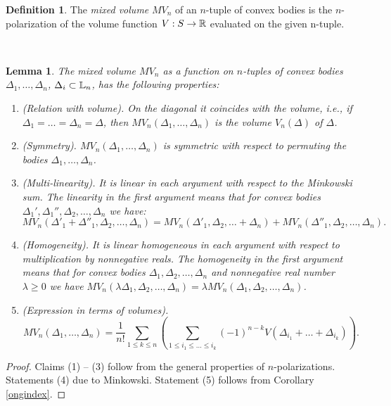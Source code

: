 \documentclass[11pt]{article}
\theoremstyle{plain}
\newtheorem{lemma}[theorem]{Lemma}
\theoremstyle{definition}
\newtheorem{definition}[theorem]{Definition}
\begin{document}
\begin{definition} The {\it  mixed volume} $MV_n$  of an $n$-tuple of convex bodies is the $n$-polarization of the volume function $V:S\to \Bbb R$  evaluated on the given n-tuple.
\end{definition}
\
\begin{lemma} The mixed volume $MV_n$  as a function  on $n$-tuples of convex bodies  $\Delta_1,\dots, \Delta_n$, $\Delta_i \subset \Bbb L_n$,  has the following properties:
\begin{enumerate}
\item (Relation with volume). On the diagonal it coincides with the volume, i.e., if $\Delta_1=\dots=\Delta_n=\Delta$, then
$MV_n(\Delta_1,\dots, \Delta_n)$ is the volume $V_n(\Delta)$ of $\Delta$.

\item  (Symmetry). $MV_n(\Delta_1,\dots, \Delta_n)$ is symmetric  with respect to permuting the bodies
$\Delta_1,\dots,\Delta_n$.


\item  (Multi-linearity). It is linear in each argument with respect to the
Minkowski sum. The linearity in the first argument means that for convex bodies $\Delta_1', \Delta_1'', \Delta_2,\dots,\Delta_n$ we have:
\begin{equation*}
MV_n(\Delta'_1 + \Delta''_1, \Delta_2,\dots, \Delta_n)= MV_n(\Delta'_1,\Delta_2,
\dots+\Delta_n)+ MV_n(\Delta''_1,\Delta_2, \dots, \Delta_n).\end{equation*}
\item (Homogeneity). It is linear homogeneous in each argument with respect to multiplication by nonnegative reals. The homogeneity in the first argument means that  for  convex bodies $\Delta_1,\Delta_2 ,\dots,\Delta_n$ and  nonnegative real number $\lambda\geq 0$ we have
$MV_n(\lambda \Delta_1,\Delta_2, \dots,\Delta_n)=\lambda MV_n(\Delta_1,\Delta_2, \dots,\Delta_n)$.

\item (Expression  in terms of volumes).
\begin{equation}\label{eq2}
MV_n(\Delta_1,\dots, \Delta_n)=\frac{1}{n!} \sum _{1\leq k\leq n} \left( \sum _{1\leq i_1\leq \dots \leq  i_k} (-1)^{n-k} V(\Delta_{i_1}+\dots+\Delta_{i_k})\right).
\end{equation}
\end{enumerate}
\end{lemma}

\begin{proof} Claims (1) -- (3) follow from the general properties of $n$-polarizations. Statements (4) due to Minkowski. Statement (5) follows from Corollary \ref{ongindex}.
\end{proof}
\end{document}
